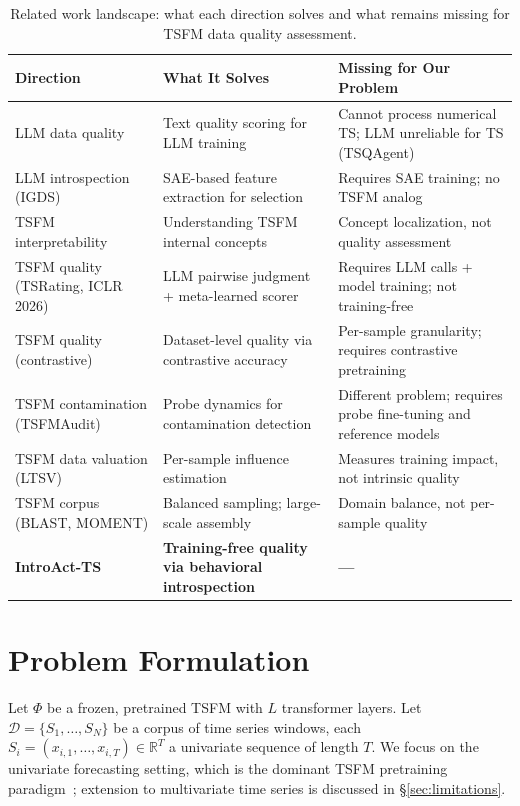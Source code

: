 \documentclass{article}
\begin{document}
\begin{table}[t]
\centering
\caption{Related work landscape: what each direction solves and what remains missing for TSFM data quality assessment.}
\label{tab:related_work}
\begin{tabular}{p{3.3cm}p{5.5cm}p{5.2cm}}
\toprule
\textbf{Direction} & \textbf{What It Solves} & \textbf{Missing for Our Problem} \\
\midrule
LLM data quality & Text quality scoring for LLM training & Cannot process numerical TS; LLM unreliable for TS (TSQAgent) \\
\midrule
LLM introspection (IGDS) & SAE-based feature extraction for selection & Requires SAE training; no TSFM analog \\
\midrule
TSFM interpretability & Understanding TSFM internal concepts & Concept localization, not quality assessment \\
\midrule
TSFM quality (TSRating, ICLR 2026)~\citep{chen2026tsrating} & LLM pairwise judgment + meta-learned scorer & Requires LLM calls + model training; not training-free \\
\midrule
TSFM quality (contrastive)~\citep{wen2024measuring} & Dataset-level quality via contrastive accuracy & Per-sample granularity; requires contrastive pretraining \\
\midrule
TSFM contamination (TSFMAudit)~\citep{li2026tsfmaudit} & Probe dynamics for contamination detection & Different problem; requires probe fine-tuning and reference models \\
\midrule
TSFM data valuation (LTSV) & Per-sample influence estimation & Measures training impact, not intrinsic quality \\
\midrule
TSFM corpus (BLAST, MOMENT) & Balanced sampling; large-scale assembly & Domain balance, not per-sample quality \\
\midrule
\textbf{IntroAct-TS} & \textbf{Training-free quality via behavioral introspection} & \textbf{---} \\
\bottomrule
\end{tabular}
\end{table}

\section{Problem Formulation}
\label{sec:problem}

Let $\Phi$ be a frozen, pretrained TSFM with $L$ transformer layers. Let $\mathcal{D} = \{S_1, \ldots, S_N\}$ be a corpus of time series windows, each $S_i = (x_{i,1}, \ldots, x_{i,T}) \in \mathbb{R}^{T}$ a univariate sequence of length $T$. We focus on the univariate forecasting setting, which is the dominant TSFM pretraining paradigm~\citep{das2024timesfm, woo2024moirai, goswami2024moment}; extension to multivariate time series is discussed in \S\ref{sec:limitations}.
\end{document}
